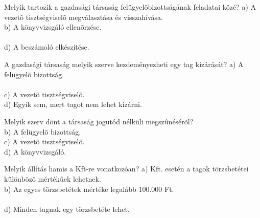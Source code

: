 \begin{frame}

\begin{tcolorbox}[title={73. Kérdés}]
Melyik tartozik a gazdasági társaság felügyelõbizottságának feladatai közé?
\tcblower
a) A vezetõ tisztségviselõ megválasztása és visszahívása.\\
b) A könyvvizsgáló ellenõrzése.\\
\\
d) A beszámoló elkészítése.
\end{tcolorbox}

\begin{tcolorbox}[title={74. Kérdés}]
A gazdasági társaság melyik szerve kezdeményezheti egy tag kizárását?
\tcblower
a) A felügyelõ bizottság.\\
\\
c) A vezetõ tisztségviselõ.\\
d) Egyik sem, mert tagot nem lehet kizárni.
\end{tcolorbox}

\begin{tcolorbox}[title={75. Kérdés}]
Melyik szerv dönt a társaság jogutód nélküli megszûnésérõl?
\tcblower
{}\\
b) A felügyelõ bizottság.\\
c) A vezetõ tisztségviselõ.\\
d) A könyvvizsgáló. 
\end{tcolorbox}

\begin{tcolorbox}[title={76. Kérdés}]
Melyik állítás hamis a Kft-re vonatkozóan?
\tcblower
a) Kft. esetén a tagok törzsbetétei különbözõ mértékûek lehetnek.\\
b) Az egyes törzsbetétek mértéke legalább 100.000 Ft.\\
\\
d) Minden tagnak egy törzsbetéte lehet.
\end{tcolorbox}

\end{frame}


